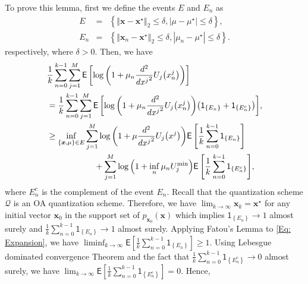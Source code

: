 \documentclass[10pt,twocolumn,twoside]{IEEEtran}
\begin{document}
\begin{IEEEproof}
To prove this lemma, first we define the events $E$ and $E_n$ as
\begin{eqnarray}
E&=&\left\{{\left\Vert{{\ensuremath{\boldsymbol{{x}}}}-{\ensuremath{\boldsymbol{{x}}}}^\star}\right\Vert_{{2}}}\leq \delta, {\left|{\mu-\mu^\star}\right|}\leq \delta\right\},\nonumber\\
E_n&=&\left\{{\left\Vert{{\ensuremath{\boldsymbol{{x}}}}_{n}-{\ensuremath{\boldsymbol{{x}}}}^\star}\right\Vert_{{2}}}\leq \delta, {\left|{\mu_n-\mu^\star}\right|}\leq \delta\right\}.\nonumber
\end{eqnarray}
respectively, where $\delta>0$. Then, we have
\begin{align}\label{Eq: Expansion}
&\frac{1}{k}\sum_{n=0}^{k-1}\sum_{j=1}^M{\ensuremath{\mathsf{E}\left[{{\ensuremath{\log{\left({{1+\mu_n\frac{d ^2}{d {x^j}^2}U_{j}{\left({{x}^{j}_{n}}\right)}}}\right)}}}} \right]}}\nonumber\\
&=\frac{1}{k}\sum_{n=0}^{k-1}\sum_{j=1}^M{\ensuremath{\mathsf{E}\left[{{\ensuremath{\log{\left({{1+\mu_n\frac{d ^2}{d {x^j}^2}U_{j}{\left({{x}^{j}_{n}}\right)}}}\right)}}}{\left({{\ensuremath{\mathsf{1}_{\left\{{E_n}\right\}}}}+{\ensuremath{\mathsf{1}_{\left\{{E^{c}_n}\right\}}}}}\right)}} \right]}},\nonumber\\
&\geq \inf_{\left\{{\ensuremath{\boldsymbol{{x}}}},\mu\right\}\in E}\sum_{j=1}^M{\ensuremath{\log{\left({{1+\mu \frac{d ^2}{d {x^j}^2}U_j{\left({{x}^{j}}\right)}}}\right)}}}{\ensuremath{\mathsf{E}\left[{\frac{1}{k}\sum_{n=0}^{k-1}{\ensuremath{\mathsf{1}_{\left\{{E_n}\right\}}}}} \right]}}\nonumber\\
&\hspace{2cm}+\sum_{j=1}^M{\ensuremath{\log{\left({{1+\inf_n\mu_nU_j^{\rm min}}}\right)}}}{\ensuremath{\mathsf{E}\left[{\frac{1}{k}\sum_{n=0}^{k-1}{\ensuremath{\mathsf{1}_{\left\{{E^{c}_n}\right\}}}}} \right]}},
\end{align}
where $E^{c}_n$ is the complement of the event $E_n$. Recall that the quantization scheme $\mathcal{Q}$ is an OA quantization scheme. Therefore, we have $\lim_{k\longrightarrow \infty} {{\ensuremath{\boldsymbol{{x}}}}}_{k}={\ensuremath{\boldsymbol{{x}}}}^\star$ for any initial vector ${\ensuremath{\boldsymbol{{x}}}}_0$ in the support set of $p_{{\ensuremath{\boldsymbol{{x}}}}_0}{\left({{\ensuremath{\boldsymbol{{x}}}}}\right)}$ which implies ${\ensuremath{\mathsf{1}_{\left\{{E_n}\right\}}}}\longrightarrow 1$ almost surely and $\frac{1}{k}\sum_{n=0}^{k-1}{\ensuremath{\mathsf{1}_{\left\{{E_n}\right\}}}}\longrightarrow 1$ almost surely. Applying Fatou's Lemma to \eqref{Eq: Expansion}, we have $ \liminf_{k\longrightarrow\infty}{\ensuremath{\mathsf{E}\left[{\frac{1}{k}\sum_{n=0}^{k-1}{\ensuremath{\mathsf{1}_{\left\{{E_n}\right\}}}}} \right]}}\geq 1$. Using Lebesgue dominated convergence Theorem and the fact that $\frac{1}{k}\sum_{n=0}^{k-1}{\ensuremath{\mathsf{1}_{\left\{{E^{c}_n}\right\}}}}\longrightarrow 0$ almost surely, we have $\lim_{k\longrightarrow \infty}{\ensuremath{\mathsf{E}\left[{\frac{1}{k}\sum_{n=0}^{k-1}{\ensuremath{\mathsf{1}_{\left\{{E^{c}_n}\right\}}}}} \right]}}=0$. Hence,

\end{IEEEproof}
\end{document}
